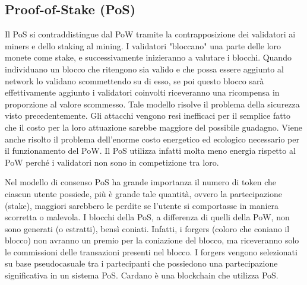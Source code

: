 \subsection{Proof-of-Stake (PoS)}
\label{pos_marker}
Il PoS \cite{pisanu2019Ethereum,vitale2018DPOS,ZHANG202093} si contraddistingue dal PoW tramite la contrapposizione dei validatori ai miners e dello staking al mining. I validatori "bloccano" una parte delle loro monete come stake, e successivamente inizieranno a valutare i blocchi. Quando individuano un blocco che ritengono sia valido e che possa essere aggiunto al network lo validano scommettendo su di esso, se poi questo blocco sarà effettivamente aggiunto i validatori coinvolti riceveranno una ricompensa in proporzione al valore scommesso.
Tale modello risolve il problema della sicurezza visto precedentemente. Gli attacchi vengono resi inefficaci per il semplice fatto che il costo per la loro attuazione sarebbe maggiore del possibile guadagno. Viene anche risolto il problema dell'enorme costo energetico ed ecologico necessario per il funzionamento del PoW. Il PoS utilizza infatti molta meno energia rispetto al PoW perché i validatori non sono in competizione tra loro.

Nel modello di consenso PoS ha grande importanza il numero di token che ciascun utente possiede, più è grande tale quantità, ovvero la partecipazione (stake), maggiori sarebbero le perdite se l'utente si comportasse in maniera scorretta o malevola.
I blocchi della PoS, a differenza di quelli della PoW, non sono generati (o estratti), bensì coniati. Infatti, i forgers (coloro che coniano il blocco) non avranno un premio per la coniazione del blocco, ma riceveranno solo le commissioni delle transazioni presenti nel blocco. I forgers vengono selezionati su base pseudocasuale tra i partecipanti che possiedono una partecipazione significativa in un sistema PoS. Cardano è una blockchain che utilizza PoS.

